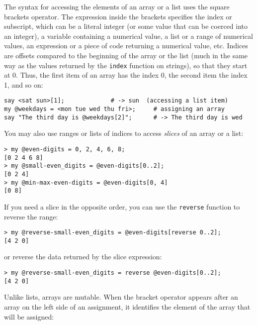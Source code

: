 The syntax for accessing the elements of an array or a list 
uses the square brackets operator.  The expression inside the 
brackets specifies the index or subscript, which can be a 
literal integer (or some value that can be coerced into 
an integer), a variable containing a numerical value, a list 
or a range of numerical values, an expression or a piece 
of code returning a numerical value, etc.  Indices are offsets 
compared to the beginning of the array 
or the list (much in the same way as the values returned 
by the {\tt index} function on strings), so that they start 
at 0. Thus, the first item of an array has the index 0, the 
second item the index 1, and so on:


\begin{verbatim}
say <sat sun>[1];             # -> sun  (accessing a list item)
my @weekdays = <mon tue wed thu fri>;     # assigning an array
say "The third day is @weekdays[2]";      # -> The third day is wed
\end{verbatim}
%

You may also use ranges or lists of indices to access 
\emph{slices} of an array or a list:

\begin{verbatim}
> my @even-digits = 0, 2, 4, 6, 8;
[0 2 4 6 8]
> my @small-even_digits = @even-digits[0..2];
[0 2 4]
> my @min-max-even-digits = @even-digits[0, 4]
[0 8]
\end{verbatim}

If you need a slice in the opposite order, you can use the 
{\tt reverse} function to reverse the range:

\begin{verbatim}
> my @reverse-small-even_digits = @even-digits[reverse 0..2];
[4 2 0]
\end{verbatim}

or reverse the data returned by the slice expression:

\begin{verbatim}
> my @reverse-small-even_digits = reverse @even-digits[0..2];
[4 2 0]
\end{verbatim}

Unlike lists, arrays are mutable.  When the bracket operator 
appears after an array on the left side of an assignment, 
it identifies the element of the array that will be assigned:

